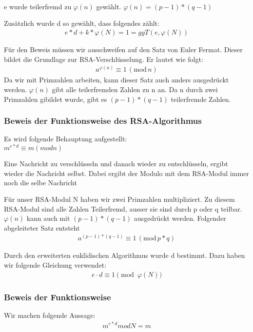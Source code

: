 e wurde teilerfremd zu $ \varphi(n) $ gewählt. 
$ \varphi(n) = (p-1)*(q-1) $

Zusätzlich wurde d so gewählt, dass folgendes zählt:
\begin{align}
 e * d + k * \varphi(N) = 1 = ggT(e,\varphi(N))
\end{align}

Für den Beweis müssen wir ausschweifen auf den Satz von Euler Fermat. Dieser bildet die Grundlage 
zur RSA-Verschlüsselung. Er lautet wie folgt:
\begin{align}
	a^{\varphi(n)} \equiv 1\,(\mathrm{mod}\,n)
\end{align}
Da wir mit Primzahlen arbeiten, kann dieser Satz auch anders ausgedrückt werden. $ \varphi(n) $ gibt alle teilerfremden Zahlen zu n an. Da n durch zwei Primzahlen gibildet wurde, gibt es $ (p-1)*(q-1) $ teilerfremde Zahlen. 

\subsubsection{Beweis der Funktionsweise des RSA-Algorithmus}
Es wird folgende Behauptung aufgestellt: \\
$ m^{e*d} \equiv m (mod n) $

Eine Nachricht zu verschlüsseln und danach wieder zu entschlüsseln, ergibt wieder die Nachricht selbst. Dabei ergibt der Modulo mit dem RSA-Modul immer noch die selbe Nachricht

Für unser RSA-Modul N haben wir zwei Primzahlen multipliziert. Zu diesem RSA-Modul sind alle Zahlen Teilerfremd, ausser sie sind durch p oder q teilbar. 
$ \varphi(n) $ kann auch mit $ (p-1) * (q-1) $ ausgedrückt werden. Folgender abgeleiteter Satz entsteht 
\begin{align}
  a^{(p-1) * (q-1)} \equiv 1\,(\mathrm{mod}\,p*q)
\end{align}

Durch den erweiterten euklidischen Algorithmus wurde d bestimmt. Dazu haben wir folgende Gleichung verwendet:
\begin{align}   
	e \cdot d \equiv 1 \pmod{\varphi(N)} 
\end{align}


\subsubsection{Beweis der Funktionsweise}
Wir machen folgende Aussage:
\begin{align}   
 m^{e*d} mod N = m
\end{align}

